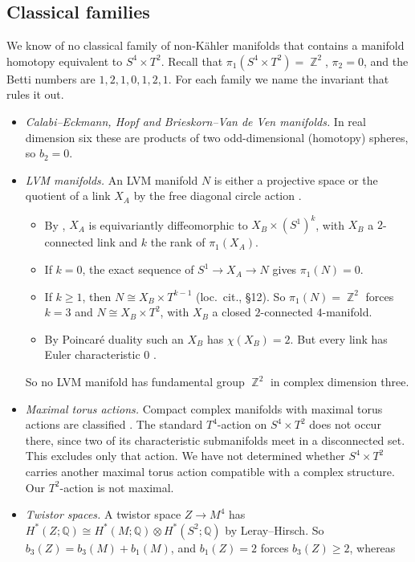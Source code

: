 \documentclass{article}
\DeclareMathOperator{\Z}{\mathbb{Z}}
\theoremstyle{definition}
\theoremstyle{plain}
\newcommand{\Q}{\mathbb{Q}}
\begin{document}
\subsection*{Classical families}
We know of no classical family of non-K\"ahler manifolds that contains a manifold
homotopy equivalent to $S^4\times T^2$. Recall that $\pi_1(S^4\times T^2)=\Z^2$,
$\pi_2=0$, and the Betti numbers are $1,2,1,0,1,2,1$. For each family we name the
invariant that rules it out.
\begin{itemize}
\item \emph{Calabi--Eckmann, Hopf and Brieskorn--Van de Ven manifolds.} In real dimension
  six these are products of two odd-dimensional (homotopy) spheres, so $b_2=0$.
\item \emph{LVM manifolds.} An LVM manifold $N$ is either a projective space or the
  quotient of a link $X_A$ by the free diagonal circle action
  \cite[\S12, discussion before Thm.~12.2]{BosioMeersseman06}.
  \begin{itemize}
  \item By \cite[Lemma~0.9]{BosioMeersseman06}, $X_A$ is equivariantly diffeomorphic
    to $X_B\times(S^1)^k$, with $X_B$ a $2$-connected link and $k$ the rank of
    $\pi_1(X_A)$.
  \item If $k=0$, the exact sequence of $S^1\to X_A\to N$ gives $\pi_1(N)=0$.
  \item If $k\ge1$, then $N\cong X_B\times T^{k-1}$ (loc.\ cit., \S12). So
    $\pi_1(N)=\Z^2$ forces $k=3$ and $N\cong X_B\times T^2$, with $X_B$ a closed
    $2$-connected $4$-manifold.
  \item By Poincar\'e duality such an $X_B$ has $\chi(X_B)=2$. But every link has
    Euler characteristic $0$ \cite[Lemma~0.10]{BosioMeersseman06}.
  \end{itemize}
  So no LVM manifold has fundamental group $\Z^2$ in complex dimension three.
\item \emph{Maximal torus actions.} Compact complex manifolds with maximal torus
  actions are classified \cite{Ishida19}. The standard $T^4$-action on $S^4\times T^2$
  does not occur there, since two of its characteristic submanifolds meet in a
  disconnected set. This excludes only that action. We have not determined whether
  $S^4\times T^2$ carries another maximal torus action compatible with a complex
  structure. Our $T^2$-action is not maximal.
\item \emph{Twistor spaces.} A twistor space $Z\to M^4$ has
  $H^*(Z;\Q)\cong H^*(M;\Q)\otimes H^*(S^2;\Q)$ by Leray--Hirsch. So
  $b_3(Z)=b_3(M)+b_1(M)$, and $b_1(Z)=2$ forces $b_3(Z)\ge2$, whereas

\end{itemize}
\end{document}
